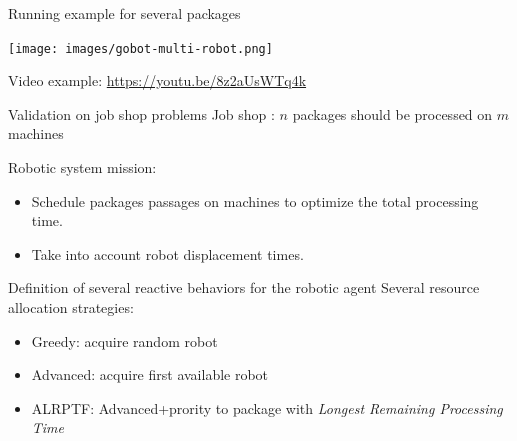 \begin{frame}{Running example for several packages}
    \centering

    \texttt{[image: images/gobot-multi-robot.png]}
    \Large

    Video example: \href{https://youtu.be/8z2aUsWTq4k}{https://youtu.be/8z2aUsWTq4k}
\end{frame}


\begin{frame}[fragile]{Validation on job shop problems}
Job shop : $n$ packages should be processed on $m$ machines

Robotic system mission:
\begin{itemize}
    \pause
    \item Schedule packages passages on machines to optimize the total processing time.
    \pause
    \item Take into account robot displacement times. 
\end{itemize}

\end{frame}


\begin{frame}{Definition of several reactive behaviors for the robotic agent}
    Several resource allocation strategies: 
    \begin{itemize}
        \pause
        \item Greedy: acquire random robot
        \pause
        \item Advanced: acquire first available robot
        \pause
        \item ALRPTF: Advanced+prority to package with \textit{Longest Remaining Processing Time}
    \end{itemize}
\end{frame}




